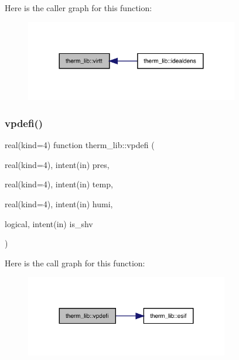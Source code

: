 Here is the caller graph for this function\+:
\nopagebreak
\begin{figure}[H]
\begin{center}
\leavevmode
\includegraphics[width=264pt]{namespacetherm__lib_adfb18489c8037340578e62f5643197f7_icgraph}
\end{center}
\end{figure}
\mbox{\label{namespacetherm__lib_a638ed06adfde6beea4477cb9bddc699f}} 
\subsubsection{\texorpdfstring{vpdefi()}{vpdefi()}}
{\footnotesize\ttfamily real(kind=4) function therm\+\_\+lib\+::vpdefi (\begin{DoxyParamCaption}\item[{real(kind=4), intent(in)}]{pres,  }\item[{real(kind=4), intent(in)}]{temp,  }\item[{real(kind=4), intent(in)}]{humi,  }\item[{logical, intent(in)}]{is\+\_\+shv }\end{DoxyParamCaption})}

Here is the call graph for this function\+:
\nopagebreak
\begin{figure}[H]
\begin{center}
\leavevmode
\includegraphics[width=251pt]{namespacetherm__lib_a638ed06adfde6beea4477cb9bddc699f_cgraph}
\end{center}
\end{figure}
\mbox{\label{namespacetherm__lib_af6ca165844a5da4f2d21a37aa3fff081}} 
